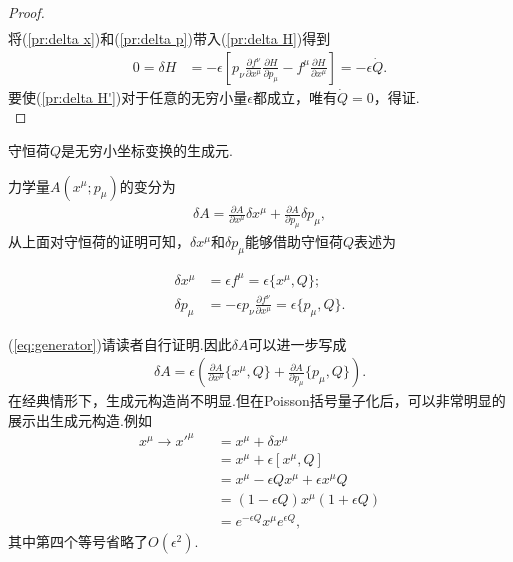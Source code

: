 \begin{proof}
\begin{equation}
\begin{split}
		\end{split}
		\end{equation}	
		将(\ref{pr:delta x})和(\ref{pr:delta p})带入(\ref{pr:delta H})得到
		\begin{equation}\label{pr:delta H'}
		\begin{split}
			0=\delta H&=-\epsilon\left[p_\nu\frac{\partial f^\nu}{\partial x^\mu}\frac{\partial H}{\partial p_\mu}-f^\mu\frac{\partial H}{\partial x^\mu}\right]=-\epsilon\dot{Q}.
		\end{split}
		\end{equation}
		要使(\ref{pr:delta H'})对于任意的无穷小量$\epsilon$都成立，唯有$\dot{Q}=0$，得证.\\
		\end{proof}
	
		\begin{theorem}
		守恒荷$Q$是无穷小坐标变换的生成元.
		\end{theorem}
	
		力学量$A(x^\mu;p_\mu)$的变分为
		\begin{eqnarray*}
		\delta A=\frac{\partial A}{\partial x^\mu}\delta x^\mu+\frac{\partial A}{\partial p_\mu}\delta p_\mu,
		\end{eqnarray*}
		从上面对守恒荷的证明可知，$\delta x^\mu$和$\delta p_\mu$能够借助守恒荷$Q$表述为
		\begin{exercise}
			\begin{equation}\label{eq:generator}
				\begin{split}
					\delta x^\mu&=\epsilon f^\mu=\epsilon\{x^\mu,Q\};\\
					\delta p_\mu&=-\epsilon p_\nu\frac{\partial f^\nu}{\partial x^\mu}=\epsilon\{p_\mu,Q\}.
				\end{split}
			\end{equation}
		\end{exercise}
		
		(\ref{eq:generator})请读者自行证明.因此$\delta A$可以进一步写成
		\begin{eqnarray*}
		\delta A=\epsilon\left(\frac{\partial A}{\partial x^\mu}\{x^\mu,Q\}+\frac{\partial A}{\partial p_\mu}\{p_\mu,Q\}\right).
		\end{eqnarray*}
		在经典情形下，生成元构造尚不明显.但在Poisson括号量子化后，可以非常明显的展示出生成元构造.例如
		\begin{eqnarray*}
		x^\mu\rightarrow x'^\mu&&=x^\mu+\delta x^\mu\\
		&&=x^\mu+\epsilon[x^\mu,Q]\\
		&&=x^\mu-\epsilon Qx^\mu+\epsilon x^\mu Q\\
		&&=\left(1-\epsilon Q\right)x^\mu\left(1+\epsilon Q\right)\\
		&&=e^{-\epsilon Q}x^\mu e^{\epsilon Q},
		\end{eqnarray*}
		其中第四个等号省略了$O(\epsilon^2)$.
	\newpage